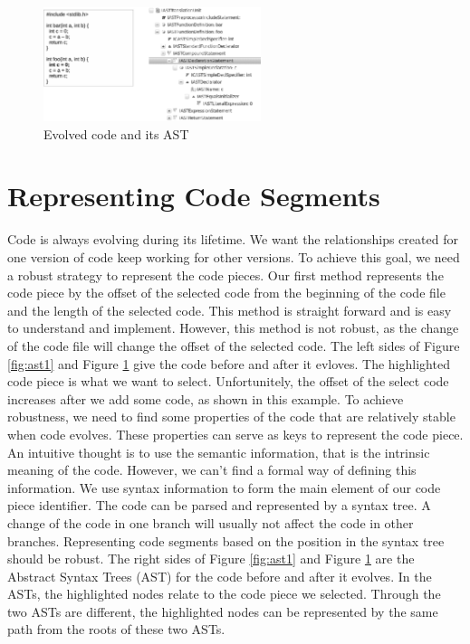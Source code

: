 \documentclass[conference]{IEEEtran}
\begin{document}
\begin{figure}
\centering
\includegraphics[width=2.5in]{ast2}
\caption{Evolved code and its AST}
\label{fig:ast2}
\end{figure}

\section{Representing Code Segments}
Code is always evolving during its lifetime.
We want the relationships created for one version of code keep working for other versions.
To achieve this goal, we need a robust strategy to represent the code pieces.
Our first method represents the code piece by the offset of the selected code from the beginning of the code file and the length of the selected code.
This method is straight forward and is easy to understand and implement.
However, this method is not robust,
as the change of the code file will change the offset of the selected code.
The left sides of Figure \ref{fig:ast1} and Figure \ref{fig:ast2} give the code before and after it evloves.
The highlighted code piece is what we want to select.
Unfortunitely, the offset of the select code increases after we add some code,
as shown in this example.
To achieve robustness, we need to find some properties of the code that are relatively stable when code evolves.
These properties can serve as keys to represent the code piece.
An intuitive thought is to use the semantic information,
that is the intrinsic meaning of the code.
However, we can't find a formal way of defining this information.
We use syntax information to form the main element of our code piece identifier.
The code can be parsed and represented by a syntax tree.
A change of the code in one branch will usually not affect the code in other branches.
Representing code segments based on the position in the syntax tree should be robust.
The right sides of Figure \ref{fig:ast1} and Figure \ref{fig:ast2} are the Abstract Syntax Trees (AST) for the code before and after it evolves.
In the ASTs, the highlighted nodes relate to the code piece we selected.
Through the two ASTs are different, 
the highlighted nodes can be represented by the same path from the roots of these two ASTs.
\end{document}
